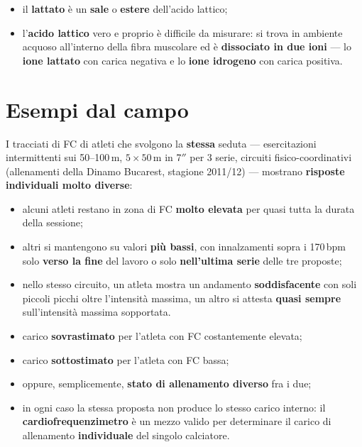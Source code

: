 \begin{itemize}
  \item il \textbf{lattato} è un \textbf{sale} o \textbf{estere} dell'acido lattico;
  \item l'\textbf{acido lattico} vero e proprio è difficile da misurare: si trova in ambiente
    acquoso all'interno della fibra muscolare ed è \textbf{dissociato in due ioni} --- lo
    \textbf{ione lattato} con carica negativa e lo \textbf{ione idrogeno} con carica positiva.
\end{itemize}

\section{Esempi dal campo}

I tracciati di FC di atleti che svolgono la \textbf{stessa} seduta --- esercitazioni intermittenti
sui 50--100\,m, $5 \times 50$\,m in 7$''$ per 3 serie, circuiti fisico-coordinativi (allenamenti
della Dinamo Bucarest, stagione 2011/12) --- mostrano \textbf{risposte individuali molto diverse}:

\begin{itemize}
  \item alcuni atleti restano in zona di FC \textbf{molto elevata} per quasi tutta la durata della
    sessione;
  \item altri si mantengono su valori \textbf{più bassi}, con innalzamenti sopra i 170\,bpm solo
    \textbf{verso la fine} del lavoro o solo \textbf{nell'ultima serie} delle tre proposte;
  \item nello stesso circuito, un atleta mostra un andamento \textbf{soddisfacente} con soli piccoli
    picchi oltre l'intensità massima, un altro si attesta \textbf{quasi sempre} sull'intensità
    massima sopportata.
\end{itemize}

\begin{itemize}
  \item carico \textbf{sovrastimato} per l'atleta con FC costantemente elevata;
  \item carico \textbf{sottostimato} per l'atleta con FC bassa;
  \item oppure, semplicemente, \textbf{stato di allenamento diverso} fra i due;
  \item in ogni caso la stessa proposta non produce lo stesso carico interno: il
    \textbf{cardiofrequenzimetro} è un mezzo valido per determinare il carico di allenamento
    \textbf{individuale} del singolo calciatore.
\end{itemize}
